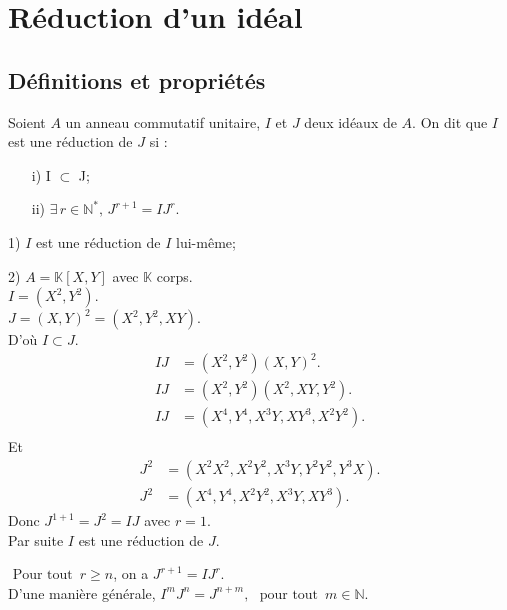 \section{Réduction d'un idéal}
\subsection{Définitions et propriétés}
\begin{madefinition}
	Soient $A$ un anneau commutatif unitaire, $I$ et $J$ deux id\'eaux de $A$.
	On dit que $I$ est une réduction de $J$ si :
	\begin{enumerate}
		\item[i)] I $\subset$ J;
		\item[ii)] $\exists\, r\in \mathbb{N}^{*} \text{, } J^{r+1} = IJ^{r}$.
	\end{enumerate}
\end{madefinition}
\begin{monexemple}
		\item[1)] $I$ est une réduction de $I$ lui-même;
		\item[2)] $A =\mathbb{K}[X,Y]$ avec $\mathbb{K}$ corps.\\
		$I = (X^2, Y^2)$.\\
		$J = (X,Y)^2 = (X^2, Y^2, XY) $.\\
		D'où $I \subset J$.
		\begin{align*}
			IJ&= (X^{2},Y^{2})(X,Y)^{2}.\\
			IJ&= (X^{2},Y^{2})(X^{2},XY,Y^{2}).\\
			IJ&= (X^{4},Y^{4},X^{3}Y,XY^{3},X^{2}Y^{2}).\\
		\end{align*}
		Et \\ 
		\begin{align*}
			J^2 &= (X^2X^2, X^2Y^2, X^3Y, Y^2Y^2, Y^3X).\\
			J^2&= (X^4, Y^4, X^2Y^2, X^3Y, XY^3).
		\end{align*}
		Donc $J^{1+1} = J^2 = IJ $ avec $r=1$.\\
		Par suite $I$ est une réduction de $J$.
\end{monexemple}
\begin{maremarque}
	\label{rem1}
	$\text{ Pour tout } \, r\geq n$, on a $J^{r+1} = IJ^{r}$.\\
	D'une manière générale, $I^{m}J^{n}=J^{n+m}, \, \, \text{ pour tout } \, m\in \mathbb{N}$.	
\end{maremarque}

